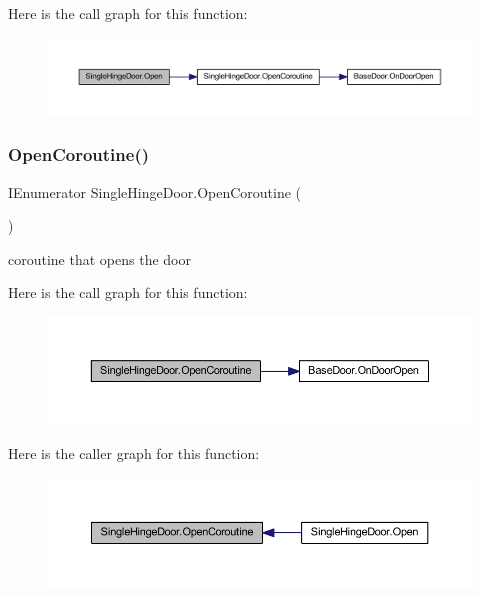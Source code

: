 Here is the call graph for this function\+:\nopagebreak
\begin{figure}[H]
\begin{center}
\leavevmode
\includegraphics[width=350pt]{class_single_hinge_door_ad48e670701a9e9d35f97de3b8ff36208_cgraph}
\end{center}
\end{figure}
\mbox{\label{class_single_hinge_door_ae0aa0776b9f80616a0b2a35d968101ad}} 
\subsubsection{\texorpdfstring{Open\+Coroutine()}{OpenCoroutine()}}
{\footnotesize\ttfamily I\+Enumerator Single\+Hinge\+Door.\+Open\+Coroutine (\begin{DoxyParamCaption}{ }\end{DoxyParamCaption})\hspace{0.3cm}{\ttfamily [private]}}



coroutine that opens the door 

Here is the call graph for this function\+:\nopagebreak
\begin{figure}[H]
\begin{center}
\leavevmode
\includegraphics[width=350pt]{class_single_hinge_door_ae0aa0776b9f80616a0b2a35d968101ad_cgraph}
\end{center}
\end{figure}
Here is the caller graph for this function\+:\nopagebreak
\begin{figure}[H]
\begin{center}
\leavevmode
\includegraphics[width=350pt]{class_single_hinge_door_ae0aa0776b9f80616a0b2a35d968101ad_icgraph}
\end{center}
\end{figure}
\mbox{\label{class_single_hinge_door_a66856e16ddf504f379a4ee5601f295c6}} 

